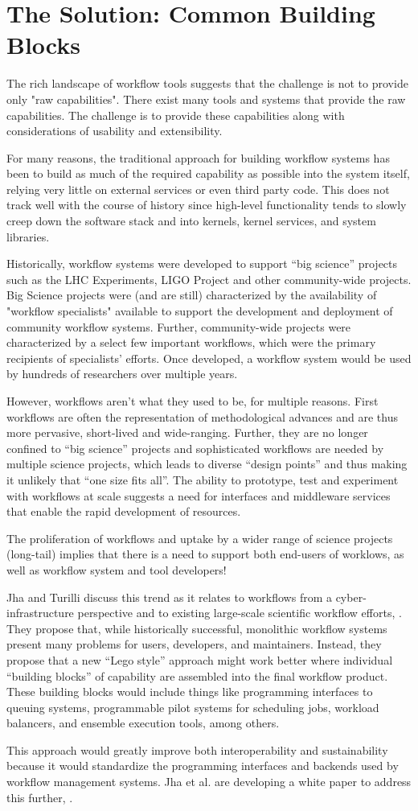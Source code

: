 \section{The Solution: Common Building Blocks}\label{buildings-blocks}

The rich landscape of workflow tools suggests that the  challenge is not to
provide only "raw capabilities". There exist many tools and systems that
provide the raw capabilities. The challenge is to provide these capabilities
along with considerations of usability and extensibility.

For many reasons, the traditional approach for building workflow systems has
been to build as much of the required capability as possible into the system
itself, relying very little on external services or even third party code.
This does not track well with the course of history since high-level
functionality tends to slowly creep down the software stack and into kernels,
kernel services, and system libraries.

Historically, workflow systems were developed to support “big science”
projects such as the LHC Experiments, LIGO Project and other community-wide
projects. Big Science projects were (and are still) characterized by the
availability of "workflow specialists" available to support the  development
and deployment of community workflow systems. Further, community-wide projects
were characterized by a select few important workflows, which were the primary
recipients of specialists' efforts. Once developed, a workflow system would
be used by hundreds of researchers over multiple years.

However, workflows aren’t what they used to be, for multiple reasons. First
workflows are often the representation of methodological advances and are thus
more pervasive, short-lived and wide-ranging. Further, they are no longer
confined to “big science” projects and sophisticated workflows are needed by
multiple science projects, which leads to diverse “design points” and thus
making it unlikely that “one size fits all”.  The ability to prototype, test
and experiment with workflows at scale suggests a need for interfaces and
middleware services that enable the rapid development of resources.

The proliferation of workflows and uptake by a wider range of science projects
(long-tail) implies that there is a need to support both end-users of worklows,
as well as workflow system and tool developers!

Jha and Turilli discuss this trend as it relates to workflows from a 
cyber-infrastructure perspective and to existing large-scale scientific workflow
efforts, \cite{jha_building_2016}. They propose that, while historically
successful, monolithic workflow systems present many problems for users,
developers, and maintainers. Instead, they propose that a new ``Lego style''
approach might work better where individual ``building blocks'' of capability
are assembled into the final workflow product. These building blocks would
include things like programming interfaces to queuing systems, programmable
pilot systems for scheduling jobs, workload balancers, and ensemble execution
tools, among others.

This approach would greatly improve both interoperability and sustainability
because it would standardize the programming interfaces and backends used by
workflow management systems. Jha et al. are developing a white paper to address
this further, \cite{jha_towards_2016}.

